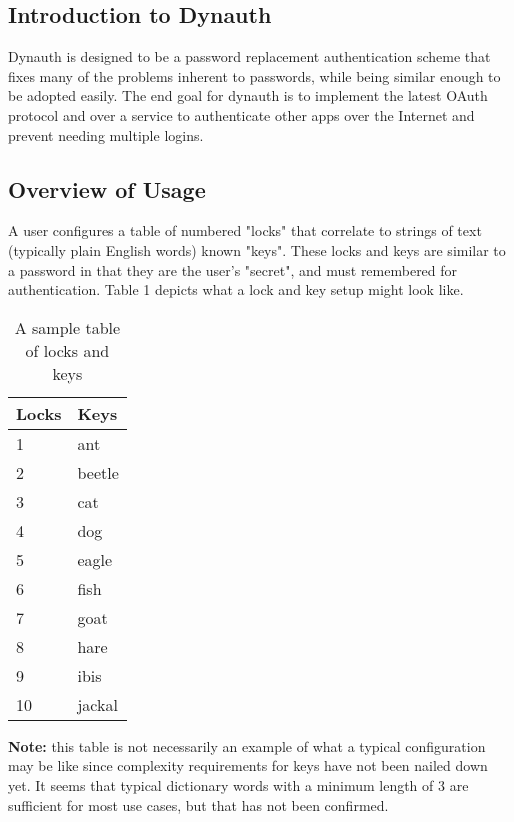 \documentclass[conference]{IEEEtran}
\begin{document}
\subsection{Introduction to Dynauth}
	Dynauth is designed to be a password replacement authentication scheme that fixes many of the problems inherent to passwords, while being similar enough to be adopted easily. The end goal for dynauth is to implement the latest OAuth protocol and over a service to authenticate other apps over the Internet and prevent needing multiple logins.
\subsection{Overview of Usage}
	A user configures a table of numbered "locks" that correlate to strings of text (typically plain English words) known "keys". These locks and keys are similar to a password in that they are the user's "secret", and must remembered for authentication.
	Table 1 depicts what a lock and key setup might look like.
	\begin{table}
		\centering
			\begin{tabular}{ | l | l | }
				\hline
				\textbf{Locks} & \textbf{Keys} \\ \hline
				1 & ant \\ \hline
				2 & beetle \\ \hline
				3 & cat \\ \hline
				4 & dog \\ \hline
				5 & eagle \\ \hline
				6 & fish \\ \hline
				7 & goat \\ \hline
				8 & hare \\ \hline
				9 & ibis \\ \hline
				10 & jackal \\ \hline
			\end{tabular}
		\caption{A sample table of locks and keys}
	\end{table}

	\textbf{Note:} this table is not necessarily an example of what a typical configuration may be like since complexity requirements for keys have not been nailed down yet. It seems that typical dictionary words with a minimum length of 3 are sufficient for most use cases, but that has not been confirmed.
	
\end{document}
